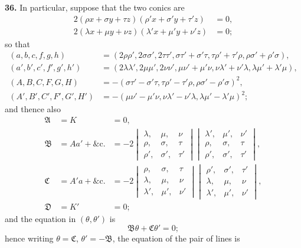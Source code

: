 \documentclass[12pt,a4paper]{article}
\newcommand{\mfA}{\mathfrak{A}}
\newcommand{\mfB}{\mathfrak{B}}
\newcommand{\mfC}{\mathfrak{C}}
\newcommand{\mfD}{\mathfrak{D}}
\theoremstyle{definition}
\begin{document}
\textbf{36.} In particular, suppose that the two conics are
\begin{align*}
2(\rho x + \sigma y + \tau z)(\rho' x + \sigma' y + \tau' z) &= 0,\\
2(\lambda x + \mu y + \nu z)(\lambda' x + \mu' y + \nu' z) &= 0;
\end{align*}
so that
\begin{align*}
(a, b, c, f, g, h) &= (2\rho\rho', 2\sigma\sigma', 2\tau\tau', \sigma\tau' + \sigma'\tau, \tau\rho' + \tau'\rho, \rho\sigma' + \rho'\sigma),\\
(a', b', c', f', g', h') &= (2\lambda\lambda', 2\mu\mu', 2\nu\nu', \mu\nu' + \mu'\nu, \nu\lambda' + \nu'\lambda, \lambda\mu' + \lambda'\mu),\\
(A, B, C, F, G, H) &= -(\sigma\tau' - \sigma'\tau, \tau\rho' - \tau'\rho, \rho\sigma' - \rho'\sigma)^{2},\\
(A', B', C', F', G', H') &= -(\mu\nu' - \mu'\nu, \nu\lambda' - \nu'\lambda, \lambda\mu' - \lambda'\mu)^{2};
\end{align*}
and thence also
\begin{align*}
\mfA &= K &= 0,\\
\mfB &= Aa' + \&\mathrm{c}. &= -2
\begin{vmatrix}
\lambda, & \mu, & \nu \\
\rho, & \sigma, & \tau \\
\rho', & \sigma', & \tau'
\end{vmatrix}
\begin{vmatrix}
\lambda', & \mu', & \nu' \\
\rho, & \sigma, & \tau \\
\rho', & \sigma', & \tau'
\end{vmatrix},\\
\mfC &= A'a + \&\mathrm{c}. &= -2
\begin{vmatrix}
\rho, & \sigma, & \tau \\
\lambda, & \mu, & \nu \\
\lambda', & \mu', & \nu'
\end{vmatrix}
\begin{vmatrix}
\rho', & \sigma', & \tau' \\
\lambda, & \mu, & \nu \\
\lambda', & \mu', & \nu'
\end{vmatrix},\\
\mfD &= K' &= 0;
\end{align*}
and the equation in $(\theta, \theta')$ is
\[
\mfB\theta + \mfC\theta' = 0;
\]
hence writing $\theta = \mfC$, $\theta' = -\mfB$, the equation of the pair of lines is
\end{document}
